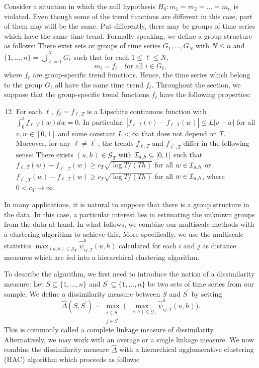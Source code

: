 \documentclass[a4paper,12pt]{article}
\begin{document}
Consider a situation in which the null hypothesis $H_0: m_1 = m_2 = \ldots = m_n$ is violated. Even though some of the trend functions are different in this case, part of them may still be the same. Put differently, there may be groups of time series which have the same time trend. Formally speaking, we define a group structure as follows: There exist sets or groups of time series $G_1,\ldots, G_N$ with $N \le n$ and $\{1,\ldots, n\} = \mathbin{\dot{\bigcup}}_{\ell=1}^{N} G_\ell$ such that for each $1 \le \ell \le N$,
\[ m_i = f_\ell \quad \text{for all } i \in G_\ell, \]
where $f_\ell$ are group-specific trend functions. Hence, the time series which belong to the group $G_\ell$ all have the same time trend $f_\ell$. Throughout the section, we suppose that the group-specific trend functions $f_\ell$ have the following properties: 
\begin{enumerate}[label=(C\arabic*),leftmargin=1.2cm]
\setcounter{enumi}{11}
\item \label{C-clustering} For each $\ell$, $f_\ell = f_{\ell,T}$ is a Lipschitz continuous function with $\int_0^1 f_{\ell,T}(w) dw = 0$. In particular, $|f_{\ell,T}(v) - f_{\ell,T}(w)| \le L |v-w|$ for all $v, w \in [0,1]$ and some constant $L < \infty$ that does not depend on $T$. Moreover, for any $\ell \ne \ell^\prime$, the trends $f_{\ell,T}$ and $f_{\ell^\prime,T}$ differ in the following sense: There exists $(u, h) \in \mathcal{G}_T$ with $\mathcal{I}_{u, h} \subseteq [0,1]$ such that $f_{\ell,T}(w) - f_{\ell^\prime,T}(w) \ge c_T \sqrt{\log T/(Th)}$ for all $w \in \mathcal{I}_{u, h}$ or $f_{\ell^\prime,T}(w) - f_{\ell,T}(w) \ge c_T \sqrt{\log T/(Th)}$ for all $w \in \mathcal{I}_{u, h}$, where $0 < c_T \rightarrow \infty$.
\end{enumerate}
In many applications, it is natural to suppose that there is a group structure in the data. In this case, a particular interest lies in estimating the unknown groups from the data at hand. In what follows, we combine our multiscale methods with a clustering algorithm to achieve this. More specifically, we use the multiscale statistics $\max_{(u, h) \in \mathcal{G}_T}\hat{\psi}^0_{ij, T}(u, h)$ calculated for each $i$ and $j$ as distance measures which are fed into a hierarchical clustering algorithm. 


To describe the algorithm, we first need to introduce the notion of a dissimilarity measure: Let $S \subseteq \{1,\ldots, n\}$ and $S^\prime \subseteq \{1,\ldots, n\}$ be two sets of time series from our sample. We define a dissimilarity measure between $S$ and $S^\prime$ by setting 
\begin{equation}\label{dissimilarity}
\widehat{\Delta}(S,S^\prime) = \max_{\substack{i \in S, \\ j \in S^\prime}} \Big(\max_{(u, h) \in \mathcal{G}_T}\hat{\psi}^0_{ij, T}(u, h)\Big). 
\end{equation}
This is commonly called a complete linkage measure of dissimilarity. Alternatively, we may work with an average or a single linkage measure. We now combine the dissimilarity measure $\widehat{\Delta}$ with a hierarchical agglomerative clustering (HAC) algorithm which proceeds as follows: 
\vspace{10pt}
\end{document}
